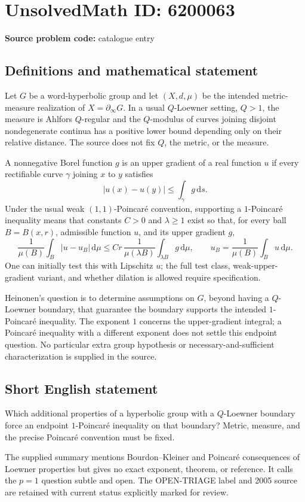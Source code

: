 \documentclass[11pt]{article}
\begin{document}
\section*{UnsolvedMath ID: 6200063}
\textbf{Source problem code:} catalogue entry
\subsection{Definitions and mathematical statement}
Let $G$ be a word-hyperbolic group and let $(X,d,\mu)$ be the intended metric-measure realization of $X=\partial_\infty G$. In a usual $Q$-Loewner setting, $Q>1$, the measure is Ahlfors $Q$-regular and the $Q$-modulus of curves joining disjoint nondegenerate continua has a positive lower bound depending only on their relative distance. The source does not fix $Q$, the metric, or the measure.

A nonnegative Borel function $g$ is an upper gradient of a real function $u$ if every rectifiable curve $\gamma$ joining $x$ to $y$ satisfies
\[
 |u(x)-u(y)|\le\int_\gamma g\,\mathrm ds.
\]
Under the usual weak $(1,1)$-Poincaré convention, supporting a $1$-Poincaré inequality means that constants $C>0$ and $\lambda\ge1$ exist so that, for every ball $B=B(x,r)$, admissible function $u$, and its upper gradient $g$,
\[
 \frac1{\mu(B)}\int_B|u-u_B|\,\mathrm d\mu
 \le Cr\,\frac1{\mu(\lambda B)}\int_{\lambda B}g\,\mathrm d\mu,
 \qquad
 u_B=\frac1{\mu(B)}\int_Bu\,\mathrm d\mu.
\]
One can initially test this with Lipschitz $u$; the full test class, weak-upper-gradient variant, and whether dilation is allowed require specification.

Heinonen's question is to determine assumptions on $G$, beyond having a $Q$-Loewner boundary, that guarantee the boundary supports the intended $1$-Poincaré inequality. The exponent $1$ concerns the upper-gradient integral; a Poincaré inequality with a different exponent does not settle this endpoint question. No particular extra group hypothesis or necessary-and-sufficient characterization is supplied in the source.
\subsection{Short English statement}
Which additional properties of a hyperbolic group with a $Q$-Loewner boundary force an endpoint $1$-Poincaré inequality on that boundary? Metric, measure, and the precise Poincaré convention must be fixed.

The supplied summary mentions Bourdon--Kleiner and Poincaré consequences of Loewner properties but gives no exact exponent, theorem, or reference. It calls the $p=1$ question subtle and open. The OPEN-TRIAGE label and 2005 source are retained with current status explicitly marked for review.
\end{document}
